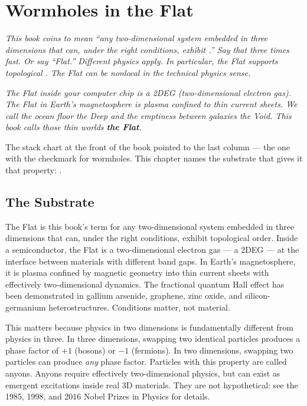
\chapter{Wormholes in the Flat}
\label{spine:the-flat}

\textit{This book coins \texttrademark{} to mean ``any two-dimensional system embedded in three dimensions that can, under the right conditions, exhibit .'' Say that three times fast. Or say ``Flat.'' Different physics apply. In particular, the Flat supports topological . The Flat can be nonlocal in the technical physics sense.}

\textit{The Flat inside your computer chip is a 2DEG (two-dimensional electron gas). The Flat in Earth's magnetosphere is plasma confined to thin current sheets. We call the ocean floor the Deep and the emptiness between galaxies the Void. This book calls those thin worlds \textbf{the Flat}.}

\vspace{0.5cm}

The stack chart at the front of the book pointed to the last column --- the one with the checkmark for wormholes. This chapter names the substrate that gives it that property: .

\section*{The Substrate}
\label{spine:flat-substrate}

The Flat is this book's term for any two-dimensional system embedded in three dimensions that can, under the right conditions, exhibit topological order. Inside a semiconductor, the Flat is a two-dimensional electron gas --- a 2DEG --- at the interface between materials with different band gaps. In Earth's magnetosphere, it is plasma confined by magnetic geometry into thin current sheets with effectively two-dimensional dynamics. The fractional quantum Hall effect has been demonstrated in gallium arsenide, graphene, zinc oxide, and silicon-germanium heterostructures. Conditions matter, not material.

This matters because physics in two dimensions is fundamentally different from physics in three. In three dimensions, swapping two identical particles produces a phase factor of $+1$ (bosons) or $-1$ (fermions). In two dimensions, swapping two particles can produce \textit{any} phase factor. Particles with this property are called anyons. Anyons require effectively two-dimensional physics, but can exist as emergent excitations inside real 3D materials. They are not hypothetical: see the 1985, 1998, and 2016 Nobel Prizes in Physics for details.

